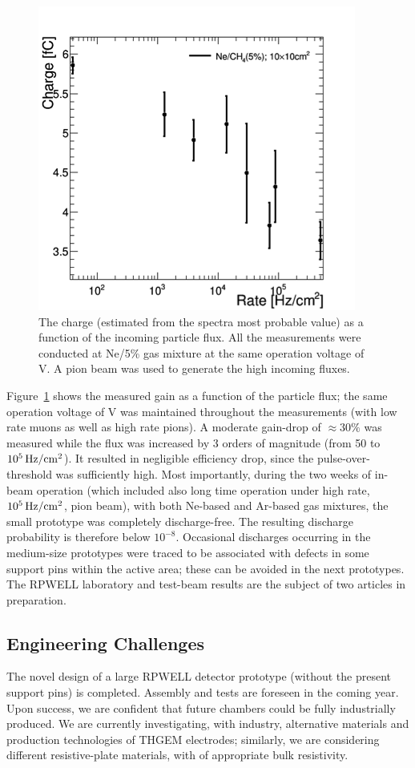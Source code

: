 \begin{figure}
	\centering
	\includegraphics[width=.5\textwidth]{Calorimeter/THGEM/charge_vs_rate.png}
	\caption{The charge (estimated from the spectra most probable value) as a function of the incoming particle flux.  All the measurements were conducted at Ne/5\% gas mixture at the same operation voltage of \unit[880]{V}. A pion beam was used to generate the high incoming fluxes.}
	\label{fig:Calorimeter:THGEM:chargeVsRate}
\end{figure}
Figure~\ref{fig:Calorimeter:THGEM:chargeVsRate} shows the measured gain as a function of the particle flux; the same operation voltage of \unit[880]{V} was maintained throughout the measurements (with low rate muons as well as high rate pions). A moderate gain-drop of $\approx 30\%$ was measured while the flux was increased by 3 orders of magnitude (from 50 to $\unit[10^5]{Hz/cm^2}$). It resulted in negligible efficiency drop, since the pulse-over-threshold was sufficiently high.
Most importantly, during the two weeks of in-beam operation (which included also long time operation under high rate, $\unit[10^5]{Hz/cm^2}$, pion beam), with both Ne-based and Ar-based gas mixtures, the small prototype was completely discharge-free. The resulting discharge probability is therefore below $10^{-8}$. Occasional discharges occurring in the medium-size prototypes were traced to be associated with defects in some support pins within the active area; these can be avoided in the next prototypes.
The RPWELL laboratory and test-beam results are the subject of two articles in preparation.


\subsection{Engineering Challenges}
The novel design of a large RPWELL detector prototype (without the present support pins) is completed. Assembly and tests are foreseen in the coming year. Upon success, we are confident that future chambers could be fully industrially produced.
We are currently investigating, with industry, alternative materials and production technologies of THGEM electrodes; similarly, we are considering different resistive-plate materials, with of appropriate bulk resistivity.

